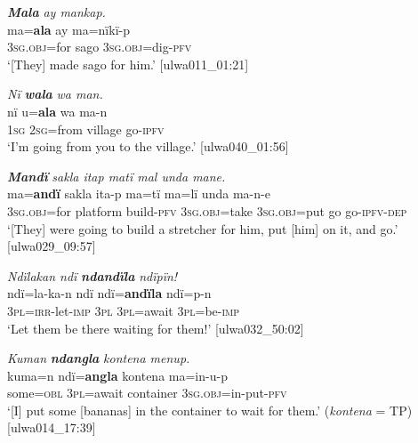 
\ea%
    \label{ex:otherwc:2}
            \textbf{\textit{Mala}} \textit{ay mankap.}\\
\gll    ma=\textbf{ala}    ay    ma=nïkï-p\\
    3\textsc{sg.obj}=for  sago  3\textsc{sg.obj}=dig{}-\textsc{pfv}\\
\glt `[They] made sago for him.’ [ulwa011\_01:21]
\z

\ea%
    \label{ex:otherwc:3}
            \textit{Nï} \textbf{\textit{wala}} \textit{wa man.}\\
\gll    nï    u=\textbf{ala}    wa    ma-n\\
    1\textsc{sg}  2\textsc{sg}=from  village  go-\textsc{ipfv}\\
\glt `I’m going from you to the village.’ [ulwa040\_01:56]
\z

\ea%
    \label{ex:otherwc:4}
            \textbf{\textit{Mandï}} \textit{sakla itap matï mal unda mane.}\\
\gll    ma=\textbf{andï}    sakla    ita-p    ma=tï       ma=lï unda  ma-n-e\\
    3\textsc{sg.obj}=for  platform  build-\textsc{pfv}  3\textsc{sg.obj}=take  3\textsc{sg.obj}=put    go    go-\textsc{ipfv-dep}\\
\glt `[They] were going to build a stretcher for him, put [him] on it, and go.’ [ulwa029\_09:57]
\z

\ea%
    \label{ex:otherwc:5}
            \textit{Ndïlakan ndï} \textbf{\textit{ndandïla}} \textit{ndïpïn!}\\
\gll    ndï=la-ka-n    ndï  ndï=\textbf{andïla}  ndï=p-n\\
    3\textsc{pl}=\textsc{irr-}let-\textsc{imp}  3\textsc{pl}  3\textsc{pl}=await    3\textsc{pl}=be-\textsc{imp}\\
\glt `Let them be there waiting for them!’ [ulwa032\_50:02]
\z

\ea%
    \label{ex:otherwc:6}
            \textit{Kuman} \textbf{\textit{ndangla}} \textit{kontena menup.}\\
\gll    kuma=n  ndï=\textbf{angla}  kontena  ma=in-u-p\\
    some=\textsc{obl}  3\textsc{pl}=await  container  3\textsc{sg.obj}=in-put-\textsc{pfv}\\
\glt `[I] put some [bananas] in the container to wait for them.’ (\textit{kontena} = TP) [ulwa014\_17:39]
\z

\newpage


